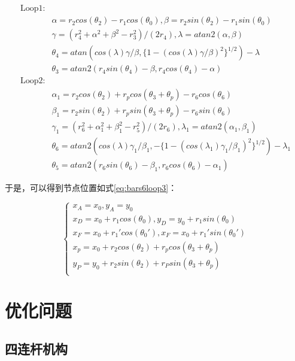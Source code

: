 \documentclass[]{ctexbook}
\begin{document}
\begin{equation}
\begin{split}
\text{Loop1:}\\
&\alpha = r_2cos(\theta_2) - r_1cos(\theta_0), \beta = r_2sin(\theta_2)-r_1sin(\theta_0) \\
&\gamma = (r_4^2+\alpha^2+\beta^2-r_3^2)/(2r_4),\lambda=atan2(\alpha,\beta)\\
&\theta_4 = atan(cos(\lambda)\gamma/\beta,\{1-(cos(\lambda)\gamma/\beta)^2\}^{1/2})-\lambda\\
&\theta_3=atan2(r_4sin(\theta_4)-\beta,r_4cos(\theta_4)-\alpha)\\
\text{Loop2:}\\
&\alpha_1 = r_2cos(\theta_2)+r_pcos(\theta_3+\theta_p)-r_6cos(\theta_6)\\
&\beta_1=r_2sin(\theta_2)+r_psin(\theta_3+\theta_p)-r_6sin(\theta_6)\\
&\gamma_1=(r_6^2+\alpha_1^2+\beta_1^2-r_5^2)/(2r_6),\lambda_1=atan2(\alpha_1,\beta_1)\\
&\theta_6=atan2(cos(\lambda)\gamma_1/\beta_1,-\{1-(cos(\lambda_1)\gamma_1/\beta_1)^{2}\}^{1/2}) - \lambda_1\\
&\theta_5 = atan2(r_6sin(\theta_6)-\beta_1,r_6cos(\theta_6)-\alpha_1)
\end{split}
\label{eq:bars6loop2}
\end{equation}

于是，可以得到节点位置如式\eqref{eq:bars6loop3}：

\begin{equation}
\begin{cases} 
x_A = x_0,y_A = y_0 \\
x_D = x_0+r_1cos(\theta_0),y_D = y_0+r_1sin(\theta_0)\\
x_F = x_0+r_1'cos(\theta_0'),x_F = x_0 + r_1'sin(\theta_0')\\
x_p = x_0 + r_2cos(\theta_2) + r_pcos(\theta_3+\theta_p)\\
y_P = y_0 + r_2sin(\theta_2)+r_Psin(\theta_3+\theta_p)\\
\end{cases}
\label{eq:bars6loop3}
\end{equation}

\section{优化问题}

\subsection{四连杆机构}\label{bars4optim}
\end{document}
